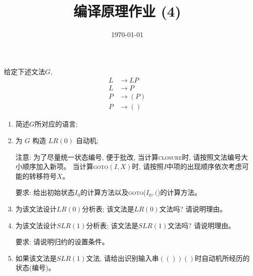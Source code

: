 \documentclass[a4paper, justified]{tufte-handout}
\title{编译原理作业 (4)}
\date{\today}
\begin{document}
\maketitle
\noplagiarism %
\begin{abstract}
\end{abstract}
\beginrequired

\begin{problem}[\score{10 = 1 + 2 + 2 + 3 + 2}]
  给定下述文法$G$,
  \begin{align}
    L &\to LP \\[8pt]
    L &\to P \\[8pt]
    P &\to (P) \\[8pt]
    P &\to ()
  \end{align}

  \begin{enumerate}[(1)]
    \item 简述$G$所对应的语言;
    \item 为 $G$ 构造 $LR(0)$ 自动机;

      注意: 为了尽量统一状态编号, 便于批改, 当计算\textsc{closure}时, 请按照文法编号大小顺序加入新项。
      当计算\textsc{goto}$(I, X)$时, 请按照$I$中项的出现顺序依次考虑可能的转移符号$X$。

      要求: 给出初始状态$I_{0}$的计算方法以及\textsc{goto}($I_{0}, ($)的计算方法。
    \item 为该文法设计$LR(0)$分析表; 该文法是$LR(0)$文法吗? 请说明理由。
    \item 为该文法设计$SLR(1)$分析表; 该文法是$SLR(1)$文法吗? 请说明理由。

      要求: 请说明归约的设置条件。
    \item 如果该文法是$SLR(1)$文法, 请给出识别输入串$(())()$时自动机所经历的状态(编号)。
  \end{enumerate}
\end{problem}
\end{document}
